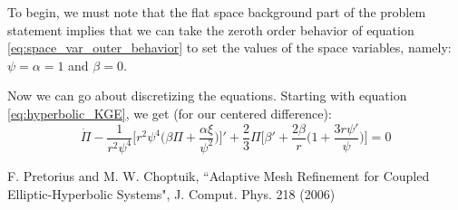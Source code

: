 \documentclass[12pt]{article}
\numberwithin{equation}{section}
\begin{document}
To begin, we must note that the flat space background part of the problem statement implies that we can take the zeroth order behavior of equation \ref{eq:space_var_outer_behavior} to set the values of the space variables, namely: $\psi = \alpha = 1$ and $\beta = 0$.

Now we can go about discretizing the equations.  Starting with equation \ref{eq:hyperbolic_KGE}, we get (for our centered difference):
\begin{equation}
\dot{\Pi} - \frac{1}{r^2 \psi^4} \Big[ r^2 \psi^4 \Big( \beta \Pi + \frac{\alpha \xi}{\psi^2} \Big)\Big]' + \frac{2}{3} \Pi \Big[ \beta' + \frac{2 \beta}{r} \Big(1 + \frac{3 r \psi'}{\psi} \Big) \Big] = 0
\end{equation}

\begin{thebibliography}{widestlabel}
	F. Pretorius and M. W. Choptuik, ``Adaptive Mesh Refinement for Coupled Elliptic-Hyperbolic Systems", J. Comput. Phys. 218 (2006)
\end{thebibliography}
\end{document}
